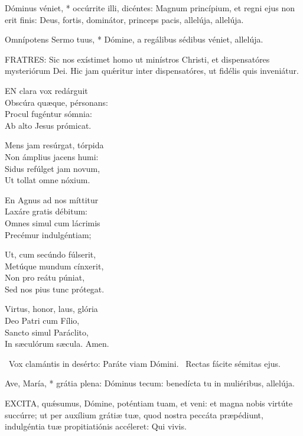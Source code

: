  Dóminus véniet, * occúrrite illi, dicéntes: Magnum princípium, et regni ejus non erit finis: Deus, fortis, dominátor, princeps pacis, allelúja, allelúja.

 Omnípotens Sermo tuus, * Dómine, a regálibus sédibus véniet, allelúja.


\lettrine[lines=2]{F}{RATRES}: Sic nos exístimet homo ut minístros Christi, et dispensatóres mysteriórum Dei. Hic jam quǽritur inter dispensatóres, ut fidélis quis inveniátur.


\lettrine[lines=2]{E}{N} clara vox redárguit\\
Obscúra quæque, pérsonans:\\
Procul fugéntur sómnia:\\
Ab alto Jesus prómicat.

Mens jam resúrgat, tórpida\\
Non ámplius jacens humi:\\
Sidus refúlget jam novum,\\
Ut tollat omne nóxium.

En Agnus ad nos míttitur\\
Laxáre gratis débitum:\\
Omnes simul cum lácrimis\\
Precémur indulgéntiam;

Ut, cum secúndo fúlserit,\\
Metúque mundum cínxerit,\\
Non pro reátu púniat,\\
Sed nos pius tunc prótegat.

Virtus, honor, laus, glória\\
Deo Patri cum Fílio,\\
Sancto simul Paráclito,\\
In sæculórum sæcula. Amen.

\V\ Vox clamántis in desérto: Paráte viam Dómini. \R\ Rectas fácite sémitas ejus.

 Ave, María, * grátia plena: Dóminus tecum: benedícta tu in muliéribus, allelúja.



\lettrine[lines=2]{E}{XCITA}, quǽsumus, Dómine, poténtiam tuam, et veni: et magna nobis virtúte succúrre; ut per auxílium grátiæ tuæ, quod nostra peccáta præpédiunt, indulgéntia tuæ propitiatiónis accéleret: Qui vivis.

